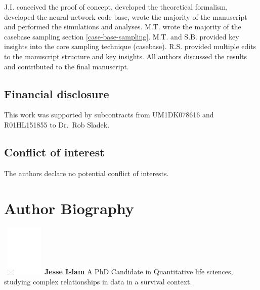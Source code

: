 \documentclass[APA,LATO1COL]{WileyNJD-v2}
\begin{document}
J.I. conceived the proof of concept, developed the theoretical formalism, developed the neural network code base, wrote the majority of the manuscript and performed the simulations and analyses. M.T. wrote the majority of the casebase sampling section \ref{case-base-sampling}. M.T. and S.B. provided key insights into the core sampling technique (casebase). R.S. provided multiple edits to the manuscript structure and key insights. All authors discussed the results and contributed to the final manuscript.

\subsection*{Financial disclosure}

This work was supported by subcontracts from UM1DK078616 and R01HL151855
to Dr.~Rob Sladek. 

\subsection*{Conflict of interest}

The authors declare no potential conflict of interests.


\appendix
%


\section*{Author Biography}

\begin{biography}{\includegraphics[width=60pt,height=70pt,draft]{empty}}{\textbf{Jesse Islam} A PhD Candidate in Quantitative life sciences, studying complex relationships in data in a survival context.}
\end{biography}
\end{document}
